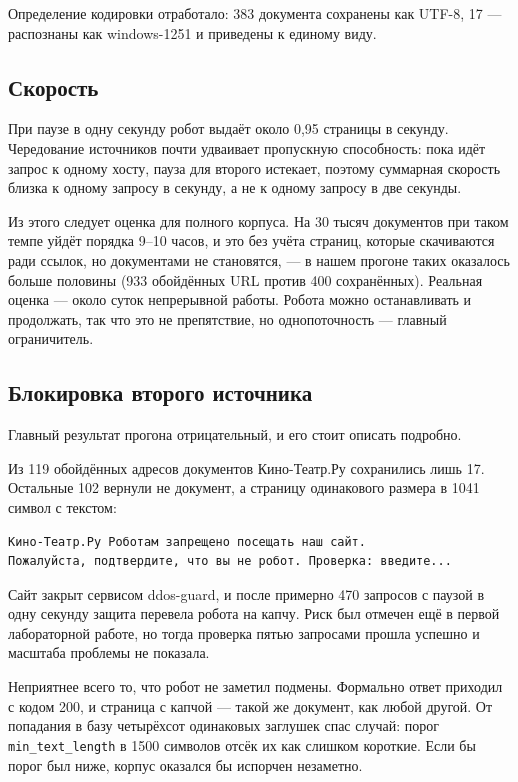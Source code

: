 Определение кодировки отработало: 383 документа сохранены как UTF-8, 17 ---
распознаны как windows-1251 и приведены к единому виду.

\subsection*{Скорость}

При паузе в одну секунду робот выдаёт около 0,95 страницы в секунду. Чередование
источников почти удваивает пропускную способность: пока идёт запрос к одному
хосту, пауза для второго истекает, поэтому суммарная скорость близка к одному
запросу в секунду, а не к одному запросу в две секунды.

Из этого следует оценка для полного корпуса. На 30 тысяч документов при таком
темпе уйдёт порядка 9--10 часов, и это без учёта страниц, которые скачиваются
ради ссылок, но документами не становятся, --- в нашем прогоне таких оказалось
больше половины (933 обойдённых URL против 400 сохранённых). Реальная оценка ---
около суток непрерывной работы. Робота можно останавливать и продолжать, так что
это не препятствие, но однопоточность --- главный ограничитель.

\subsection*{Блокировка второго источника}

Главный результат прогона отрицательный, и его стоит описать подробно.

Из 119 обойдённых адресов документов Кино-Театр.Ру сохранились лишь 17. Остальные
102 вернули не документ, а страницу одинакового размера в 1041 символ с текстом:

\begin{verbatim}
Кино-Театр.Ру Роботам запрещено посещать наш сайт.
Пожалуйста, подтвердите, что вы не робот. Проверка: введите...
\end{verbatim}

Сайт закрыт сервисом ddos-guard, и после примерно 470 запросов с паузой в одну
секунду защита перевела робота на капчу. Риск был отмечен ещё в первой
лабораторной работе, но тогда проверка пятью запросами прошла успешно и масштаба
проблемы не показала.

Неприятнее всего то, что робот не заметил подмены. Формально ответ приходил с
кодом 200, и страница с капчой --- такой же документ, как любой другой. От
попадания в базу четырёхсот одинаковых заглушек спас случай: порог
\texttt{min\_text\_length} в 1500 символов отсёк их как слишком короткие. Если бы
порог был ниже, корпус оказался бы испорчен незаметно.

